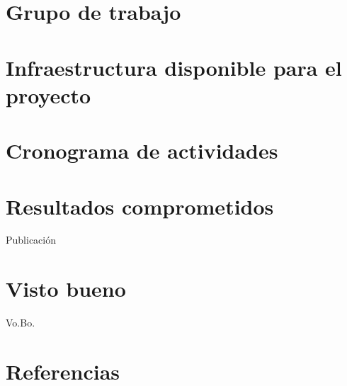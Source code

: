\documentclass[12pt,letterpaper,draft,titlepage]{article}
\begin{document}
\maketitle

\tableofcontents






\section {Grupo de trabajo}

\section {Infraestructura disponible para el proyecto}

\section {Cronograma de actividades}

\section {Resultados comprometidos}
Publicación
\section {Visto bueno}
Vo.Bo.
\section {Referencias}
\printbibliography[heading=none]
\end{document}
